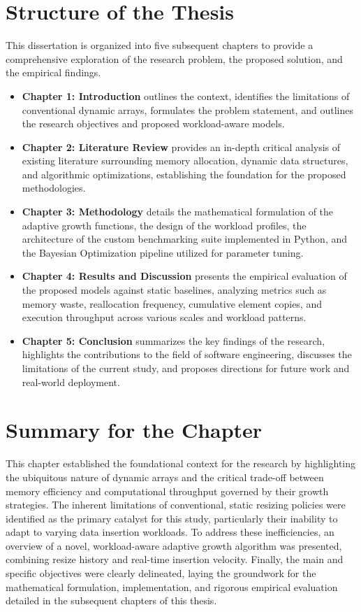 \section{Structure of the Thesis}
This dissertation is organized into five subsequent chapters to provide a 
comprehensive exploration of the research problem, the proposed solution, and the 
empirical findings. 
\begin{itemize}
    \item \textbf{Chapter 1: Introduction} outlines the context, identifies the 
    limitations of conventional dynamic arrays, formulates the problem statement, 
    and outlines the research objectives and proposed workload-aware models.
    \item \textbf{Chapter 2: Literature Review} provides an in-depth critical 
    analysis of existing literature surrounding memory allocation, dynamic data 
    structures, and algorithmic optimizations, establishing the foundation for 
    the proposed methodologies.
    \item \textbf{Chapter 3: Methodology} details the mathematical formulation of 
    the adaptive growth functions, the design of the workload profiles, the 
    architecture of the custom benchmarking suite implemented in Python, and the 
    Bayesian Optimization pipeline utilized for parameter tuning.
    \item \textbf{Chapter 4: Results and Discussion} presents the empirical 
    evaluation of the proposed models against static baselines, analyzing metrics 
    such as memory waste, reallocation frequency, cumulative element copies, and 
    execution throughput across various scales and workload patterns.
    \item \textbf{Chapter 5: Conclusion} summarizes the key findings of the 
    research, highlights the contributions to the field of software engineering, 
    discusses the limitations of the current study, and proposes directions for 
    future work and real-world deployment.
\end{itemize}

\section{Summary for the Chapter}
This chapter established the foundational context for the research by highlighting 
the ubiquitous nature of dynamic arrays and the critical trade-off between memory 
efficiency and computational throughput governed by their growth strategies. The 
inherent limitations of conventional, static resizing policies were identified as 
the primary catalyst for this study, particularly their inability to adapt to 
varying data insertion workloads. To address these inefficiencies, an overview of 
a novel, workload-aware adaptive growth algorithm was presented, combining resize 
history and real-time insertion velocity. Finally, the main and specific objectives 
were clearly delineated, laying the groundwork for the mathematical formulation, 
implementation, and rigorous empirical evaluation detailed in the subsequent 
chapters of this thesis.
